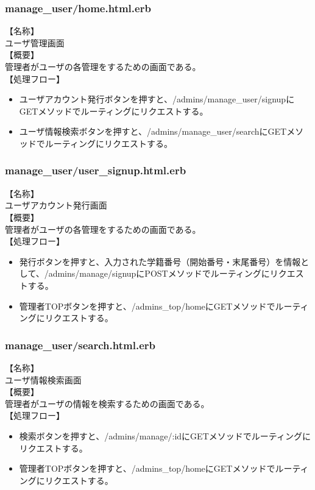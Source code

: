 \documentclass[a4j]{jarticle}
\begin{document}
\subsubsection{manage\_user/home.html.erb}
\noindent
【名称】\\
ユーザ管理画面\\
【概要】\\
管理者がユーザの各管理をするための画面である。\\
【処理フロー】
\begin{itemize}
  \item ユーザアカウント発行ボタンを押すと、/admins/manage\_user/signupにGETメソッドでルーティングにリクエストする。
  \item ユーザ情報検索ボタンを押すと、/admins/manage\_user/searchにGETメソッドでルーティングにリクエストする。
\end{itemize}

\subsubsection{manage\_user/user\_signup.html.erb}
\noindent
【名称】\\
ユーザアカウント発行画面\\
【概要】\\
管理者がユーザの各管理をするための画面である。\\
【処理フロー】
\begin{itemize}
  \item 発行ボタンを押すと、入力された学籍番号（開始番号・末尾番号）を情報として、/admins/manage/signupにPOSTメソッドでルーティングにリクエストする。
  \item 管理者TOPボタンを押すと、/admins\_top/homeにGETメソッドでルーティングにリクエストする。
\end{itemize}

\subsubsection{manage\_user/search.html.erb}
\noindent
【名称】\\
ユーザ情報検索画面\\
【概要】\\
管理者がユーザの情報を検索するための画面である。\\
【処理フロー】
\begin{itemize}
  \item 検索ボタンを押すと、/admins/manage/:idにGETメソッドでルーティングにリクエストする。
  \item 管理者TOPボタンを押すと、/admins\_top/homeにGETメソッドでルーティングにリクエストする。
\end{itemize}
\end{document}
